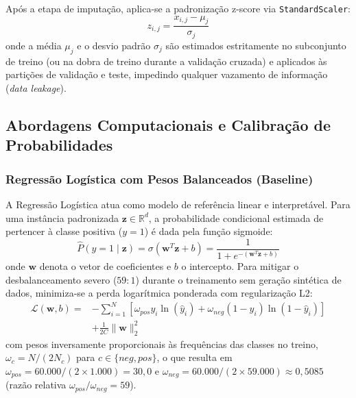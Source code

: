 \documentclass[conference]{IEEEtran}
\begin{document}
Após a etapa de imputação, aplica-se a padronização z-score via \texttt{StandardScaler}:
\begin{equation}
    z_{i,j} = \frac{x_{i,j} - \mu_j}{\sigma_j}
\end{equation}
onde a média $\mu_j$ e o desvio padrão $\sigma_j$ são estimados estritamente no subconjunto de treino (ou na dobra de treino durante a validação cruzada) e aplicados às partições de validação e teste, impedindo qualquer vazamento de informação (\textit{data leakage}).

\subsection{Abordagens Computacionais e Calibração de Probabilidades}

\subsubsection{Regressão Logística com Pesos Balanceados (Baseline)}
A Regressão Logística atua como modelo de referência linear e interpretável. Para uma instância padronizada $\mathbf{z} \in \mathbb{R}^{d}$, a probabilidade condicional estimada de pertencer à classe positiva ($y = 1$) é dada pela função sigmoide:
\begin{equation}
    \hat{P}(y=1 \mid \mathbf{z}) = \sigma(\mathbf{w}^T \mathbf{z} + b) = \frac{1}{1 + e^{-(\mathbf{w}^T \mathbf{z} + b)}}
\end{equation}
onde $\mathbf{w}$ denota o vetor de coeficientes e $b$ o intercepto. Para mitigar o desbalanceamento severo ($59:1$) durante o treinamento sem geração sintética de dados, minimiza-se a perda logarítmica ponderada com regularização L2:
\begin{equation}
\begin{aligned}
    \mathcal{L}(\mathbf{w}, b) = &-\sum_{i=1}^{N} \left[ \omega_{pos} y_i \ln(\hat{y}_i) + \omega_{neg} (1 - y_i) \ln(1 - \hat{y}_i) \right] \\
    &+ \frac{1}{2C} \|\mathbf{w}\|_2^2
\end{aligned}
\end{equation}
com pesos inversamente proporcionais às frequências das classes no treino, $\omega_c = N / (2 N_c)$ para $c \in \{neg, pos\}$, o que resulta em $\omega_{pos} = 60.000/(2 \times 1.000) = 30{,}0$ e $\omega_{neg} = 60.000/(2 \times 59.000) \approx 0{,}5085$ (razão relativa $\omega_{pos}/\omega_{neg} = 59$).
\end{document}
